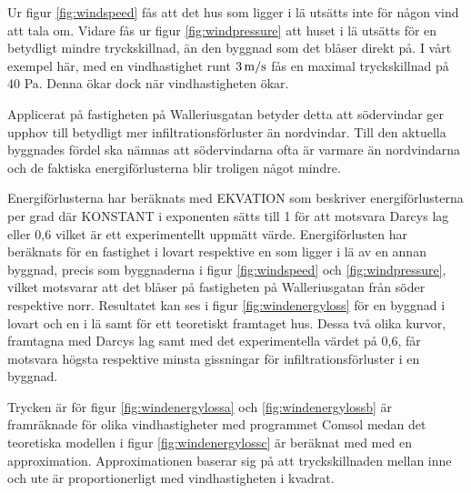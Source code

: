 Ur figur \ref{fig:windspeed} fås att det hus som ligger i lä utsätts inte för någon vind att tala om. Vidare fås ur figur \ref{fig:windpressure} att huset i lä utsätts för en betydligt mindre tryckskillnad, än den byggnad som det blåser direkt på. I vårt exempel här, med en vindhastighet runt $\unit[3]{m/s}$ fås en maximal tryckskillnad på 40 Pa. Denna ökar dock när vindhastigheten ökar.

Applicerat på fastigheten på Walleriusgatan betyder detta att södervindar ger upphov till betydligt mer infiltrationsförluster än nordvindar. Till den aktuella byggnades fördel ska nämnas att södervindarna ofta är varmare än nordvindarna och de faktiska energiförlusterna blir troligen något mindre.


Energiförlusterna har beräknats med EKVATION som beskriver energiförlusterna per grad där KONSTANT i exponenten sätts till 1 för att motsvara Darcys lag eller 0,6 vilket är ett experimentellt uppmätt värde. Energiförlusten har beräknats för en fastighet i lovart respektive en som ligger i lä av en annan byggnad, precis som byggnaderna i figur \ref{fig:windspeed} och \ref{fig:windpressure}, vilket motsvarar att det blåser på fastigheten på Walleriusgatan från söder respektive norr. Resultatet kan ses i figur \ref{fig:windenergyloss} för en byggnad i lovart och en i lä samt för ett teoretiskt framtaget hus. Dessa två olika kurvor, framtagna med Darcys lag samt med det experimentella värdet på 0,6, får motsvara högsta respektive minsta gissningar för infiltrationsförluster i en byggnad. 

Trycken är för figur \ref{fig:windenergylossa} och \ref{fig:windenergylossb} är framräknade för olika vindhastigheter med programmet Comsol medan det teoretiska modellen i figur \ref{fig:windenergylossc} är beräknat med med en approximation. Approximationen baserar sig på att tryckskillnaden mellan inne och ute är proportionerligt med vindhastigheten i kvadrat.

